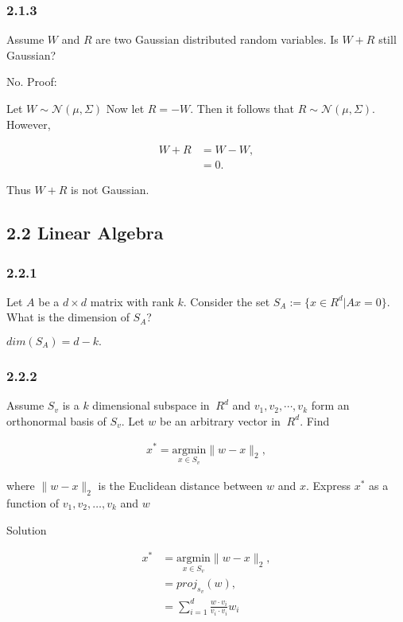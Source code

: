\documentclass[11pt]{article}
\begin{document}
    \subsubsection{2.1.3}\label{section}

Assume \(W\) and \(R\) are two Gaussian distributed random variables. Is
\(W+R\) still Gaussian?

    No. Proof:

Let \(W \sim \mathcal{N} (\mu, \Sigma)\) Now let \(R = -W\). Then it
follows that \(R \sim \mathcal{N} (\mu, \Sigma)\). However,

\begin{align*}
W+R &= W-W,\\
&= 0.
\end{align*}

Thus \(W+R\) is not Gaussian.

    \subsection{2.2 Linear Algebra}\label{linear-algebra}

    \subsubsection{2.2.1}\label{section}

Let \(A\) be a \(d\times d\) matrix with rank \(k\). Consider the set
\(S_A:=\{x \in \!R^d|Ax = 0\}\). What is the dimension of \(S_A\)?

    \(dim(S_A) = d-k.\)

    \subsubsection{2.2.2}\label{section}

Assume \(S_v\) is a \(k\) dimensional subspace in \(\  \!R^d\) and
\(v_1,v_2,\cdots, v_k\) form an orthonormal basis of \(S_v\). Let \(w\)
be an arbitrary vector in \(\  \!R^d\). Find

\begin{align}
x^* = \underset{x\in S_v}{\text{argmin}}\|w-x\|_2,
\end{align}

where \(\|w-x\|_2\) is the Euclidean distance between \(w\) and \(x\).
Express \(x^*\) as a function of \(v_1, v_2, \dots, v_k\) and \(w\)

    Solution

\begin{align}
x^* &= \underset{x\in S_v}{\text{argmin}}\|w-x\|_2,\\
&= proj_{s_v}(w),\\
&= \sum_{i=1}^d\frac{w \cdot v_i}{v_i \cdot v_i}w_i
\end{align}
\end{document}
